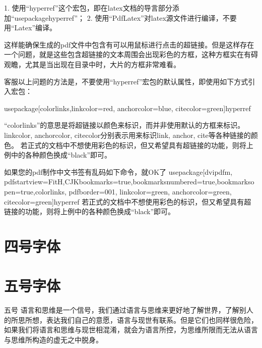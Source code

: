 \documentclass[11pt,a4paper]{article}
\newcommand{\asong}{\CJKfamily{asong}}
\newcommand{\wuhao}{\fontsize{10.5pt}{10.5pt}\selectfont}
\begin{document}
1. 使用“hyperref”这个宏包，即在latex文档的导言部分添加“usepackage{hyperref}”；
2. 使用“PdfLatex”对latex源文件进行编译，不要用“Latex”编译。

 

这样能确保生成的pdf文件中包含有可以用鼠标进行点击的超链接。但是这样存在一个问题，就是这些包含超链接的文本周围会出现彩色的方框，这种方框实在有碍观瞻，尤其是当出现在目录中时，大片的方框非常难看。

客服以上问题的方法是，不要使用“hyperref”宏包的默认属性，即使用如下方式引入宏包：

 usepackage[colorlinks,linkcolor=red, anchorcolor=blue, citecolor=green]{hyperref}

“colorlinks”的意思是将超链接以颜色来标识，而并非使用默认的方框来标识。
linkcolor, anchorcolor, citecolor分别表示用来标识link, anchor, cite等各种链接的颜色。
若正式的文档中不想使用彩色的标识，但又希望具有超链接的功能，则将上例中的各种颜色换成“black”即可。

如果您的pdf制作中文书签有乱码如下命令，就OK了
usepackage[dvipdfm,  pdfstartview=FitH,CJKbookmarks=true,bookmarksnumbered=true,bookmarksopen=true,colorlinks, pdfborder=001, linkcolor=green,  anchorcolor=green, citecolor=green]{hyperref}
 若正式的文档中不想使用彩色的标识，但又希望具有超链接的功能，则将上例中的各种颜色换成“black”即可。
\section{四号字体}
\wuhao {四号
“书籍是世界珍贵的财富，是世世代代和一切国家最好的继承。最古老和最优秀的书籍自然而然地、合情合理地占据着每一所房子里的书架。它们没有自己的利益与诉求，但是在它们给读者以启迪和激励的时候，读者的常识使他不会拒绝书籍。在任何一个社会中，书籍的作者者是天生的极富魅力的精英分子，对人类发挥着比帝王们更大的影响 。当目不识丁的、也许还是鄙视一切的商人，通过魄力和勤奋挣得了垂涎已久的闲暇和衣食无忧的生活，进入了财富和时尚的圈子 以后，最终不可避免地会转向那更高的然而却难以企及的知识和财富的圈子，这时他才会意识到自己文化的残缺，以及他一切财富的空虚无用；于是他不遗余力地要使子女获得知识文化，他深刻地感到自己这方面的不足，从而证明了他的明智；就这样，他成了一个家族的缔造者。”}
\section{五号字体}

\wuhao  \asong 五号
 语言和思维是一个信号，我们通过语言与思维来更好地了解世界，了解别人的所思所想，表达我们自己的意愿，语言与现世有联系。但是它们也同样很危险，如果我们将语言和思维与现世相混淆，就会为语言所控，为思维所限而无法从语言与思维所构造的虚无之中脱身。
\clearpage
\wuhao
\end{document}
